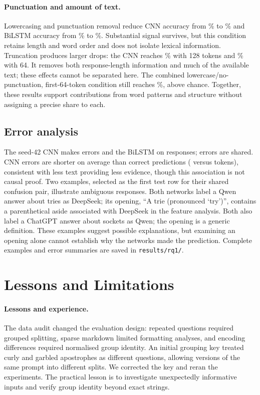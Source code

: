 \documentclass[11pt]{article}
\begin{document}
\paragraph{Punctuation and amount of text.} Lowercasing and punctuation removal reduce CNN accuracy
from \RqOneCnnSeedAcc\% to \AblCnnLowerNopunctAcc\% and BiLSTM accuracy from \RqOneLstmSeedAcc\%
to \AblLstmLowerNopunctAcc\%. Substantial signal survives, but this condition retains length and word
order and does not isolate lexical information. Truncation produces larger drops: the CNN reaches
\AblCnnTruncateOnetwentyeightAcc\% with 128 tokens and \AblCnnTruncateSixtyfourAcc\% with 64.
It removes both response-length information and much of the available text; these effects cannot be separated
here. The combined lowercase/no-punctuation, first-64-token condition still reaches
\AblCnnLowerNopunctTruncateSixtyfourAcc\%, above chance. Together, these results support contributions
from word patterns and structure without assigning a precise share to each.

\subsection{Error analysis}
The seed-42 CNN makes \ErrCnn{} errors and the BiLSTM \ErrLstm{} on \TestRows{} responses;
\ErrBoth{} errors are shared. CNN errors are shorter on average than correct predictions
(\ErrTokensCnnWrong{} versus \ErrTokensCnnCorrect{} tokens), consistent with less text providing less
evidence, though this association is not causal proof.
Two examples, selected as the first test row for their shared confusion pair, illustrate ambiguous responses.
Both networks label a Qwen answer about tries as DeepSeek; its opening, ``A trie (pronounced `try')'',
contains a parenthetical aside associated with DeepSeek in the feature analysis. Both also label a ChatGPT
answer about sockets as Qwen; the opening is a generic definition. These examples suggest possible explanations,
but examining an opening alone cannot establish why the networks made the prediction. Complete examples
and error summaries are saved in \texttt{results/rq1/}.

\section{Lessons and Limitations}
\paragraph{Lessons and experience.} The data audit changed the evaluation design: repeated questions
required grouped splitting, sparse markdown limited formatting analyses, and encoding differences required
normalised group identity. An initial grouping key treated curly and garbled apostrophes as different
questions, allowing versions of the same prompt into different splits. We corrected the key and reran
the experiments. The practical lesson is to investigate unexpectedly informative inputs and verify group
identity beyond exact strings.
\end{document}
